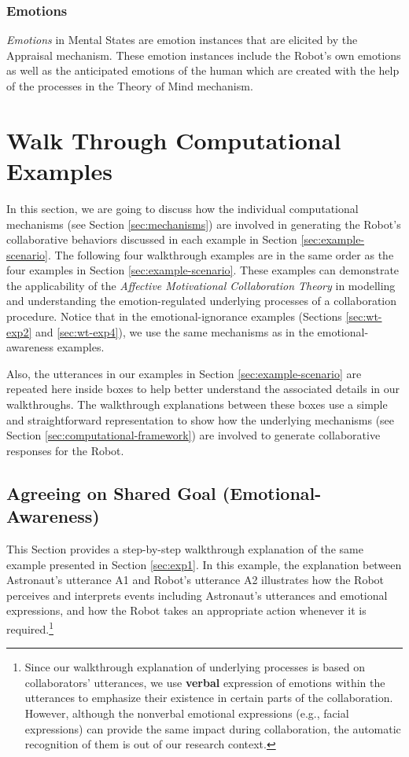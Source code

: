 \subsubsection{Emotions}

\textit{Emotions} in Mental States are emotion instances that are elicited by
the Appraisal mechanism. These emotion instances include the Robot's own
emotions as well as the anticipated emotions of the human which are created with
the help of the processes in the Theory of Mind mechanism.

\section{Walk Through Computational Examples}
\label{sec:wtce}

In this section, we are going to discuss how the individual computational
mechanisms (see Section \ref{sec:mechanisms}) are involved in generating the
Robot's collaborative behaviors discussed in each example in Section
\ref{sec:example-scenario}. The following four walkthrough examples are in the
same order as the four examples in Section \ref{sec:example-scenario}. These
examples can demonstrate the applicability of the \textit{Affective Motivational
Collaboration Theory} in modelling and understanding the emotion-regulated
underlying processes of a collaboration procedure. Notice that in the
emotional-ignorance examples (Sections \ref{sec:wt-exp2} and \ref{sec:wt-exp4}),
we use the same mechanisms as in the emotional-awareness examples.

Also, the utterances in our examples in Section \ref{sec:example-scenario} are
repeated here inside boxes to help better understand the associated details in
our walkthroughs. The walkthrough explanations between these boxes use a simple
and straightforward representation to show how the underlying mechanisms (see
Section \ref{sec:computational-framework}) are involved to generate
collaborative responses for the Robot.

\subsection{Agreeing on Shared Goal (Emotional-Awareness)}
\label{sec:wt-exp1}

This Section provides a step-by-step walkthrough explanation of the same
example presented in Section \ref{sec:exp1}. In this example, the explanation
between Astronaut's utterance A1 and Robot's utterance A2 illustrates how the
Robot perceives and interprets events including Astronaut's utterances and
emotional expressions, and how the Robot takes an appropriate action whenever it
is required.\footnote{Since our walkthrough explanation of underlying processes
is based on collaborators' utterances, we use \textbf{verbal} expression of
emotions within the utterances to emphasize their existence in certain parts of
the collaboration. However, although the nonverbal emotional expressions (e.g.,
facial expressions) can provide the same impact during collaboration, the
automatic recognition of them is out of our research context.}\\

